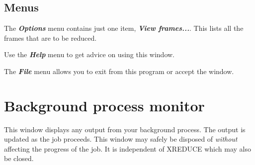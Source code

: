 \documentclass[11pt]{article}
\newcommand{\xlabel}[1]{}
\newcommand{\menu}[1]{{\bf \em #1}}
\begin{document}
\subsection{Menus \xlabel{CCDReduceExtrasMenu}}
The \menu{Options} menu contains just one item, \menu{View
frames...}. This lists all the frames that are to be reduced.

Use the \menu{Help} menu to get advice on using this window.

The \menu{File} menu allows you to exit from this program or
accept the window.

\section{Background process monitor \xlabel{CCDFileMonitorMain}}
This window displays any output from your background process. The
output is updated as the job proceeds. This window may safely be
disposed of {\em without} affecting the progress of the job. It is
independent of XREDUCE which may also be closed.
\end{document}
